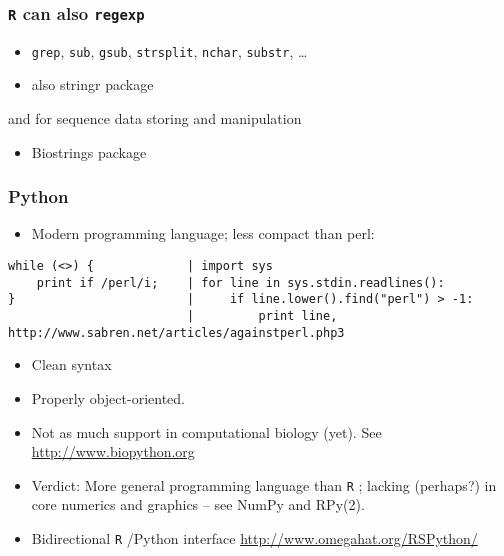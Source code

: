 \documentclass{beamer}
\newcommand{\R}{\texttt{R} }
\newcommand{\Rpackage}[1]{{\mbox{\normalfont\textsf{#1}}}}
\begin{document}
\begin{frame}
\frametitle{\R can also \texttt{regexp}}
\label{sec-1-6}

\begin{itemize}
\item \texttt{grep}, \texttt{sub}, \texttt{gsub}, \texttt{strsplit}, \texttt{nchar}, \texttt{substr}, \ldots{}
\item also \Rpackage{stringr} package
\end{itemize}

and for sequence data storing and manipulation 

\begin{itemize}
\item \Rpackage{Biostrings} package
\end{itemize}
\end{frame}
\begin{frame}[fragile]
\frametitle{Python}
\label{sec-1-7}


\begin{itemize}
\item Modern programming language; less compact than perl:
\end{itemize}

\footnotesize

\begin{verbatim}
while (<>) {             | import sys
    print if /perl/i;    | for line in sys.stdin.readlines():
}                        |     if line.lower().find("perl") > -1:
                         |         print line,
http://www.sabren.net/articles/againstperl.php3
\end{verbatim}
\normalsize

\begin{itemize}
\item Clean syntax
\item Properly object-oriented.
\item Not as much support in computational biology (yet).  See
  \href{http://www.biopython.org}{http://www.biopython.org}
\item Verdict: More general programming language than \R; lacking (perhaps?)
  in core numerics and graphics -- see NumPy and RPy(2).
\item Bidirectional \R/Python interface \href{http://www.omegahat.org/RSPython/}{http://www.omegahat.org/RSPython/}
\end{itemize}
\end{frame}
\end{document}
